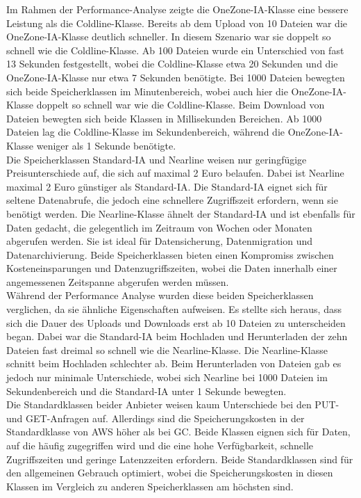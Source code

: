 Im Rahmen der Performance-Analyse zeigte die OneZone-IA-Klasse eine bessere Leistung als die Coldline-Klasse. Bereits ab dem Upload von 10 Dateien war die OneZone-IA-Klasse deutlich schneller. In diesem Szenario war sie doppelt so schnell wie die Coldline-Klasse. Ab 100 Dateien wurde ein Unterschied von fast 13 Sekunden festgestellt, wobei die Coldline-Klasse etwa 20 Sekunden und die OneZone-IA-Klasse nur etwa 7 Sekunden benötigte. Bei 1000 Dateien bewegten sich beide Speicherklassen im Minutenbereich, wobei auch hier die OneZone-IA-Klasse doppelt so schnell war wie die Coldline-Klasse. Beim Download von Dateien bewegten sich beide Klassen in Millisekunden Bereichen. Ab 1000 Dateien lag die Coldline-Klasse im Sekundenbereich, während die OneZone-IA-Klasse weniger als 1 Sekunde benötigte.\\

Die Speicherklassen Standard-IA und Nearline weisen nur geringfügige Preisunterschiede auf, die sich auf maximal 2 Euro belaufen. Dabei ist Nearline maximal 2 Euro günstiger als Standard-IA. Die Standard-IA eignet sich für seltene Datenabrufe, die jedoch eine schnellere Zugriffszeit erfordern, wenn sie benötigt werden. Die Nearline-Klasse ähnelt der Standard-IA und ist ebenfalls für Daten gedacht, die gelegentlich im Zeitraum von Wochen oder Monaten abgerufen werden. Sie ist ideal für Datensicherung, Datenmigration und Datenarchivierung. Beide Speicherklassen bieten einen Kompromiss zwischen Kosteneinsparungen und Datenzugriffszeiten, wobei die Daten innerhalb einer angemessenen Zeitspanne abgerufen werden müssen.\\

Während der Performance Analyse wurden diese beiden Speicherklassen verglichen, da sie ähnliche Eigenschaften aufweisen. Es stellte sich heraus, dass sich die Dauer des Uploads und Downloads erst ab 10 Dateien zu unterscheiden began. Dabei war die Standard-IA beim Hochladen und Herunterladen der zehn Dateien fast dreimal so schnell wie die Nearline-Klasse. Die Nearline-Klasse schnitt beim Hochladen schlechter ab. Beim Herunterladen von Dateien gab es jedoch nur minimale Unterschiede, wobei sich Nearline bei 1000 Dateien im Sekundenbereich und die Standard-IA unter 1 Sekunde bewegten.\\

Die Standardklassen beider Anbieter weisen kaum Unterschiede bei den PUT- und GET-Anfragen auf. Allerdings sind die Speicherungskosten in der Standardklasse von AWS höher als bei GC. Beide Klassen eignen sich für Daten, auf die häufig zugegriffen wird und die eine hohe Verfügbarkeit, schnelle Zugriffszeiten und geringe Latenzzeiten erfordern. Beide Standardklassen sind für den allgemeinen Gebrauch optimiert, wobei die Speicherungskosten in diesen Klassen im Vergleich zu anderen Speicherklassen am höchsten sind.\\


